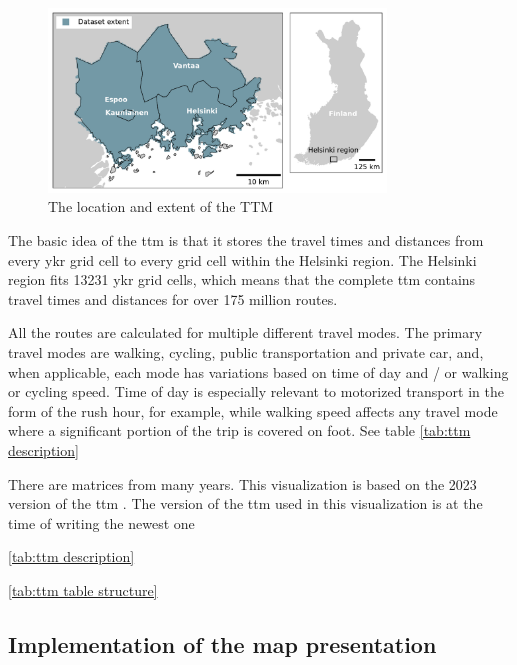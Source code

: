 \begin{figure}[H]
	\centering
	\includegraphics[width=0.8\textwidth]{visual/figures/ttm/ttm_extent.pdf}
	\caption{The location and extent of the TTM}
	\label{fig:ttm extent}
\end{figure}

The basic idea of the \acrshort{ttm} is that it stores the travel times and distances
from every \acrshort{ykr} grid cell to every grid cell within the Helsinki region.
The Helsinki region fits 13231 \acrshort{ykr} grid cells,
which means that the complete \acrshort{ttm} contains travel times and distances for
over 175 million routes.

All the routes are calculated for multiple different travel modes.
The primary travel modes are walking, cycling, public transportation and private car,
and, when applicable, each mode has variations based on
time of day and / or walking or cycling speed.
Time of day is especially relevant to motorized transport
in the form of the rush hour, for example,
while walking speed affects any travel mode
where a significant portion of the trip is covered on foot.
See table \ref{tab:ttm description} 


There are matrices from many years.
This visualization is based on the 2023 version of the \acrshort{ttm}
\parencite{fin2023}.
The version of the \acrshort{ttm} used in this visualization is at the time of writing the newest one

\ref{tab:ttm description}



\ref{tab:ttm table structure}





\subsection{Implementation of the map presentation}

